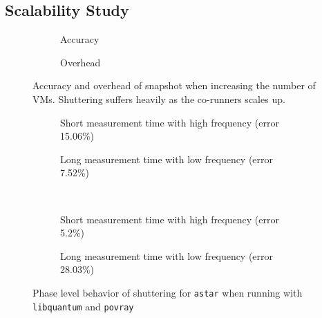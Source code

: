 \documentclass{sig-alternate}
\begin{document}
\subsection{Scalability	 Study}
\label{subsec:ScalabilityStudy}
\begin{figure*}
\centering
\begin{subfigure}[t]{1\columnwidth}
\centering
{}
\caption{Accuracy}
\label{fig:scaleup-accuracy}
\end{subfigure}
\hfill
\begin{subfigure}[t]{1\columnwidth}
\centering
{}
\caption{Overhead}
\label{fig:scaleup-overhead}
\end{subfigure}
\caption{Accuracy and overhead of snapshot when increasing the number of VMs. Shuttering suffers heavily as the co-runners scales up.}
\label{fig:scaleup}
\end{figure*}
\begin{figure*}
\centering
\begin{subfigure}[t]{1\columnwidth}
\centering
{}
\caption{Short measurement time with high frequency (error 15.06\%)}
\label{fig:astarpriorlib}
\end{subfigure}
\hfill
\begin{subfigure}[t]{1\columnwidth}
\centering
{}
\caption{Long measurement time with low frequency (error 7.52\%)}
\label{fig:astarpriorlib2}
\end{subfigure}
\hfill\\
\begin{subfigure}[t]{1\columnwidth}
\centering
{}
\caption{Short measurement time with high frequency (error 5.2\%)}
\label{fig:astarpriorpovray}
\end{subfigure}
\hfill
\begin{subfigure}[t]{1\columnwidth}
\centering
{}
\caption{Long measurement time with low frequency (error 28.03\%)}
\label{fig:astarpovray}
\end{subfigure}
\caption{Phase level behavior of shuttering for \texttt{astar} when running with \texttt{libquantum} and \texttt{povray}}
\label{fig:astarcompare}
\end{figure*}
\end{document}
